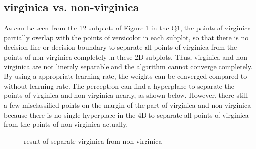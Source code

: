 \documentclass{article}
\begin{document}
\subsection{virginica vs. non-virginica}
As can be seen from the 12 subplots of Figure 1 in the Q1, the points of virginica partially overlap with the points of versicolor in each subplot, so that there is no decision line or decision boundary to separate all points of virginica from the points of non-virginica completely in these 2D subplots. Thus, virginica and non-virginica are not lineraly separable and the algorithm cannot converge completely.\\
By using a appropriate learning rate, the weights can be converged compared to without learning rate. The perceptron can find a hyperplane to separate the points of virginica and non-virginica nearly, as shown below. However, there still a few misclassified points on the margin of the part of virginica and non-virginica because there is no single hyperplace in the 4D to separate all points of virginica from the points of non-virginica actually.
\begin{figure}[H]
\centering
{}
\caption{result of separate virginica from non-virginica} \label{fig:1}
\end{figure}
\noindent
\end{document}
